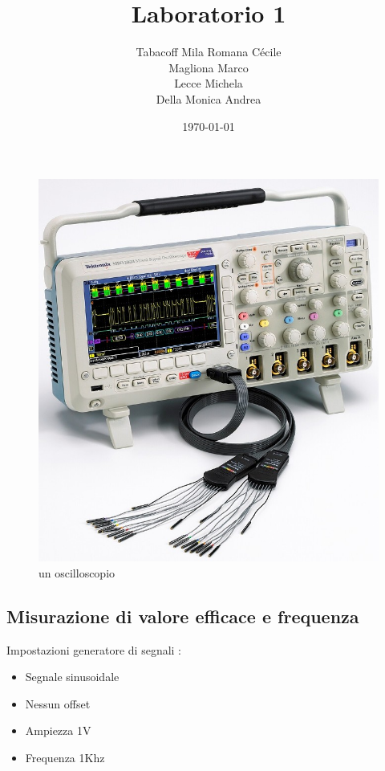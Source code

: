 \documentclass[a4paper]{article}
\begin{document}
\title{Laboratorio 1}
\author{
        Tabacoff Mila Romana Cécile \\
        Magliona Marco \\
        Lecce Michela \\
        Della Monica Andrea}

\date{\today}
\maketitle


\begin{figure}[h]
\centering
\includegraphics[scale=0.5]{dso.jpg}
\caption{un oscilloscopio}
\end{figure}

\newpage

\begin{tcolorbox}[breakable,colback=cyan,colframe=cyan]
\section*{Misurazione di valore efficace e frequenza}
\end{tcolorbox}

Impostazioni generatore di segnali :
\begin{itemize}
\item Segnale sinusoidale
\item Nessun offset
\item Ampiezza 1V
\item Frequenza 1Khz
\end{itemize}
\end{document}
